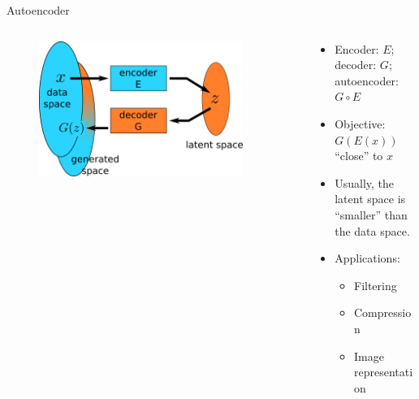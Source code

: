 \documentclass[xcolor=pdftex,dvipsnames,table,mathserif,aspectratio=169]{beamer}
\begin{document}
\begin{frame}{Autoencoder}

\begin{columns}
  \begin{column}{.5\textwidth}
  \begin{figure}[ht]
    \centering
    \includegraphics[width=0.9\textwidth]{ae.png}
  \end{figure}

  \end{column}

  \begin{column}{.5\textwidth}
  \begin{itemize}
  \item Encoder: $E$; decoder: $G$; autoencoder: $G \circ E$
  \item Objective: $G(E(x))$ ``close'' to $x$
  \item Usually, the latent space is ``smaller'' than the data space.
  \item Applications:
   \begin{itemize}
   \item Filtering
   \item Compression
   \item Image representation
   \end{itemize}
  \end{itemize}

  \end{column}
\end{columns}



\end{frame}
\end{document}
